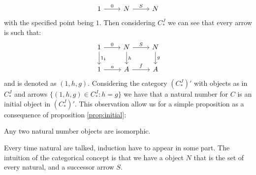 \[
  \begin{tikzcd}
    1\arrow{r}{0} & N\arrow{r}{S} & N
  \end{tikzcd}
\]
with the specified point being $1$. Then considering $C_*^J$ we can see that every arrow is such that: 
\[
  \begin{tikzcd}
    1\arrow{r}{0}\arrow{d}{1_1} & N\arrow{r}{S}\arrow{d}{h} & N\arrow{d}{g}\\
    1\arrow{r}{a} & A\arrow{r}{f} & A
  \end{tikzcd}
\]
and is denoted as $(1,h,g)$. Considering the category $(C_*^J)'$ with objects as in $C_*^J$ and arrows  $\{(1,h,g)\in C_*^J: h=g\}$ we have that a natural number for $C$ is an initial object in $(C_*^J)'$. This observation allow us for a simple proposition as a consequence of proposition \ref{prop:initial}:

\begin{proposition}
  Any two natural number objects are isomorphic.
\end{proposition}

Every time natural are talked, induction have to appear in some part. The intuition of the categorical concept is that we have a object $N$ that is the set of every natural, and a successor arrow $S$. 

